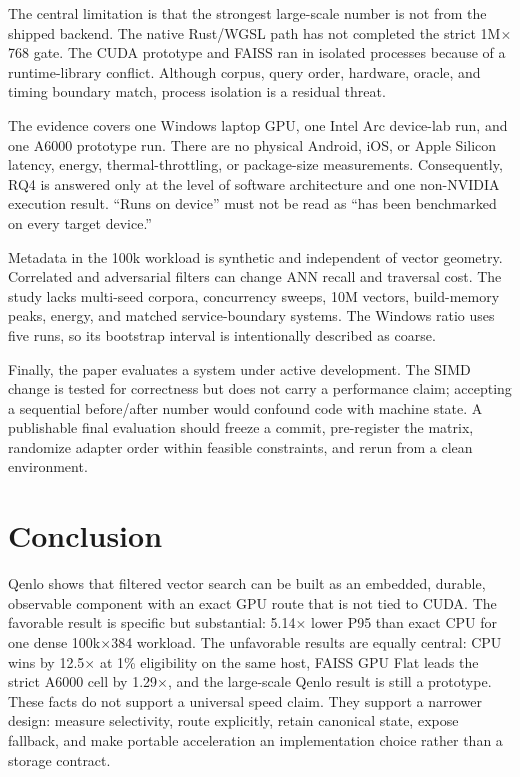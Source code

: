 \documentclass{article}
\begin{document}
The central limitation is that the strongest large-scale number is not from the shipped backend.
The native Rust/WGSL path has not completed the strict 1M$\times$768 gate. The CUDA prototype and
FAISS ran in isolated processes because of a runtime-library conflict. Although corpus, query
order, hardware, oracle, and timing boundary match, process isolation is a residual threat.

The evidence covers one Windows laptop GPU, one Intel Arc device-lab run, and one A6000 prototype
run. There are no physical Android, iOS, or Apple Silicon latency, energy, thermal-throttling, or
package-size measurements. Consequently, RQ4 is answered only at the level of software
architecture and one non-NVIDIA execution result. ``Runs on device'' must not be read as ``has
been benchmarked on every target device.''

Metadata in the 100k workload is synthetic and independent of vector geometry. Correlated and
adversarial filters can change ANN recall and traversal cost. The study lacks multi-seed corpora,
concurrency sweeps, 10M vectors, build-memory peaks, energy, and matched service-boundary systems.
The Windows ratio uses five runs, so its bootstrap interval is intentionally described as coarse.

Finally, the paper evaluates a system under active development. The SIMD change is tested for
correctness but does not carry a performance claim; accepting a sequential before/after number
would confound code with machine state. A publishable final evaluation should freeze a commit,
pre-register the matrix, randomize adapter order within feasible constraints, and rerun from a
clean environment.

\section{Conclusion}

Qenlo shows that filtered vector search can be built as an embedded, durable, observable component
with an exact GPU route that is not tied to CUDA. The favorable result is specific but substantial:
5.14$\times$ lower P95 than exact CPU for one dense 100k$\times$384 workload. The unfavorable
results are equally central: CPU wins by 12.5$\times$ at 1\% eligibility on the same host, FAISS
GPU Flat leads the strict A6000 cell by 1.29$\times$, and the large-scale Qenlo result is still a
prototype. These facts do not support a universal speed claim. They support a narrower design:
measure selectivity, route explicitly, retain canonical state, expose fallback, and make portable
acceleration an implementation choice rather than a storage contract.
\end{document}
